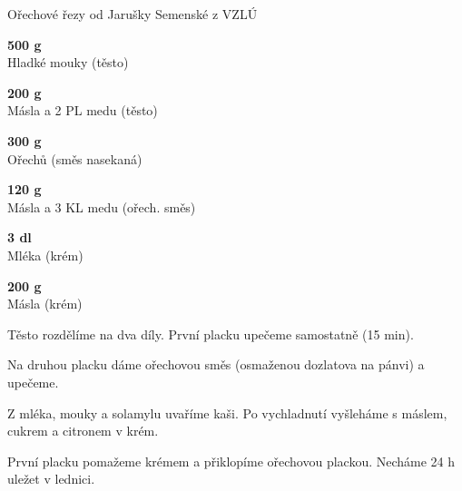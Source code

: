 \documentclass[11pt,a4paper]{article}
\begin{document}
\begin{recipe}[Chocolate]{Ořechové řezy od Jarušky Semenské z VZLÚ}
    \begin{ingredients}
        \item \parbox[t]{\linewidth}{\raggedright \weight \textbf{500 g}\\ Hladké mouky (těsto)}
        \item \parbox[t]{\linewidth}{\raggedright \weight \textbf{200 g}\\ Másla a 2 PL medu (těsto)}
        \item \parbox[t]{\linewidth}{\raggedright \piece \textbf{300 g}\\ Ořechů (směs nasekaná)}
        \item \parbox[t]{\linewidth}{\raggedright \weight \textbf{120 g}\\ Másla a 3 KL medu (ořech. směs)}
        \item \parbox[t]{\linewidth}{\raggedright \liquid \textbf{3 dl}\\ Mléka (krém)}
        \item \parbox[t]{\linewidth}{\raggedright \weight \textbf{200 g}\\ Másla (krém)}
    \end{ingredients}
    \begin{steps}
        \item Těsto rozdělíme na dva díly. První placku upečeme samostatně (15 min).
        \item Na druhou placku dáme ořechovou směs (osmaženou dozlatova na pánvi) a upečeme.
        \item Z mléka, mouky a solamylu uvaříme kaši. Po vychladnutí vyšleháme s máslem, cukrem a citronem v krém.
        \item První placku pomažeme krémem a přiklopíme ořechovou plackou. Necháme 24 h uležet v lednici.
    \end{steps}
\end{recipe}
\end{document}
